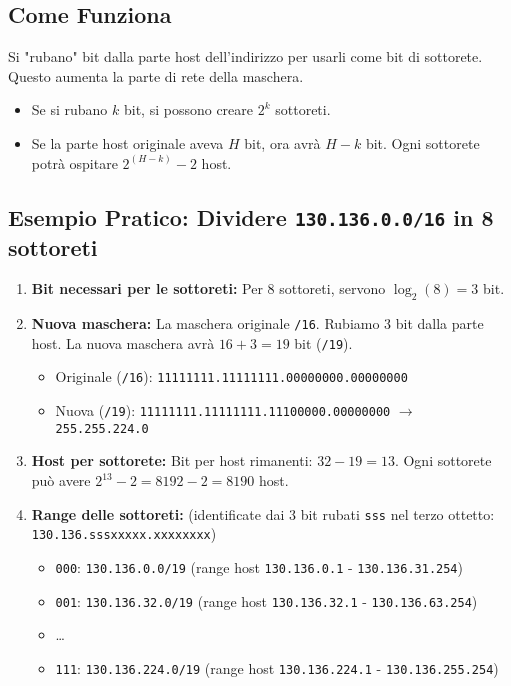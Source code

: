 \subsection{Come Funziona}
Si "rubano" bit dalla parte host dell'indirizzo per usarli come bit di sottorete. Questo aumenta la parte di rete della maschera.
\begin{itemize}
    \item Se si rubano $k$ bit, si possono creare $2^k$ sottoreti.
    \item Se la parte host originale aveva $H$ bit, ora avrà $H-k$ bit. Ogni sottorete potrà ospitare $2^{(H-k)} - 2$ host.
\end{itemize}

\subsection{Esempio Pratico: Dividere \texttt{130.136.0.0/16} in 8 sottoreti}
\begin{enumerate}
    \item \textbf{Bit necessari per le sottoreti:} Per 8 sottoreti, servono $\log_2(8) = 3$ bit.
    \item \textbf{Nuova maschera:} La maschera originale \texttt{/16}. Rubiamo 3 bit dalla parte host. La nuova maschera avrà $16 + 3 = 19$ bit (\texttt{/19}).
    \begin{itemize}
        \item Originale (\texttt{/16}): \texttt{11111111.11111111.00000000.00000000}
        \item Nuova (\texttt{/19}): \texttt{11111111.11111111.11100000.00000000} $\rightarrow$ \texttt{255.255.224.0}
    \end{itemize}
    \item \textbf{Host per sottorete:} Bit per host rimanenti: $32 - 19 = 13$.
    Ogni sottorete può avere $2^{13} - 2 = 8192 - 2 = 8190$ host.
    \item \textbf{Range delle sottoreti:} (identificate dai 3 bit rubati \texttt{sss} nel terzo ottetto: \texttt{130.136.sssxxxxx.xxxxxxxx})
    \begin{itemize}
        \item \texttt{000}: \texttt{130.136.0.0/19} (range host \texttt{130.136.0.1} - \texttt{130.136.31.254})
        \item \texttt{001}: \texttt{130.136.32.0/19} (range host \texttt{130.136.32.1} - \texttt{130.136.63.254})
        \item \dots
        \item \texttt{111}: \texttt{130.136.224.0/19} (range host \texttt{130.136.224.1} - \texttt{130.136.255.254})
    \end{itemize}
\end{enumerate}
